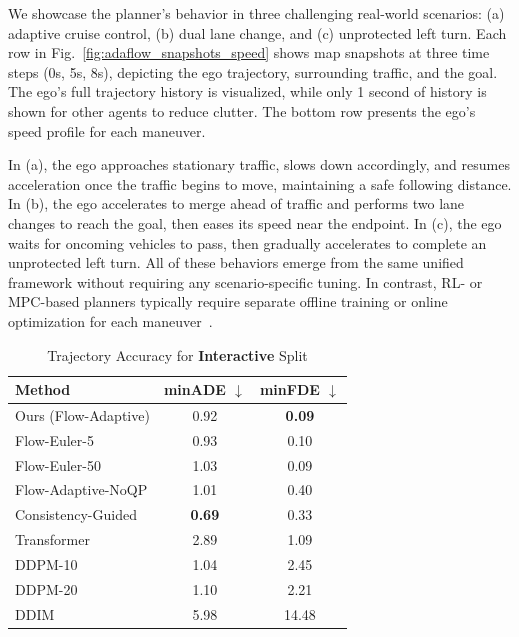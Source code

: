 \documentclass[conference]{IEEEtran}
\begin{document}
We showcase the planner’s  behavior in three challenging real-world scenarios: (a) adaptive cruise control, (b) dual lane change, and (c) unprotected left turn. Each row in Fig.~\ref{fig:adaflow_snapshots_speed} shows map snapshots at three time steps (0s, 5s, 8s), depicting the ego trajectory, surrounding traffic, and the goal. The ego's full trajectory history is visualized, while only 1 second of history is shown for other agents to reduce clutter. The bottom row presents the ego's speed profile for each maneuver.

In (a), the ego approaches stationary traffic, slows down accordingly, and resumes acceleration once the traffic begins to move, maintaining a safe following distance. In (b), the ego accelerates to merge ahead of traffic and performs two lane changes to reach the goal, then eases its speed near the endpoint. In (c), the ego waits for oncoming vehicles to pass, then gradually accelerates to complete an unprotected left turn. All of these behaviors emerge from the same unified framework without requiring any scenario-specific tuning. In contrast, RL- or MPC-based planners typically require separate offline training or online optimization for each maneuver~\cite{ad_constraints}.

\begin{table}[t]
\centering
\caption{Trajectory Accuracy for \textbf{Interactive} Split}
\label{tab:interactive_realism}
\begin{tabular}{lcc}
\toprule
\textbf{Method} & \textbf{minADE} $\downarrow$ & \textbf{minFDE} $\downarrow$ \\
\midrule
Ours (Flow-Adaptive) & 0.92 & \textbf{0.09} \\ 
Flow-Euler-5  & 0.93 & 0.10 \\
Flow-Euler-50 & 1.03 & 0.09 \\
Flow-Adaptive-NoQP & 1.01 & 0.40 \\
Consistency-Guided       & \textbf{0.69} & 0.33 \\
Transformer       & 2.89 & 1.09 \\
DDPM-10           & 1.04 & 2.45 \\
DDPM-20           & 1.10 & 2.21 \\
DDIM              & 5.98 & 14.48 \\
\bottomrule
\end{tabular}
\end{table}
\end{document}
